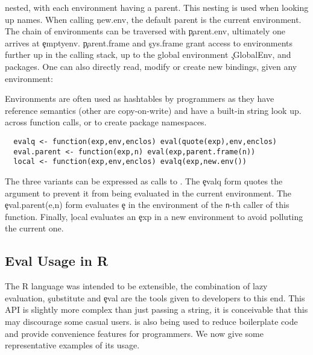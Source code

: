 \documentclass[acmsmall]{acmart}
\begin{document}
nested, with each environment having a parent. This nesting is used
when looking up names. When calling \c{new.env}, the default parent is
the current environment. The chain of environments can be traversed
with \c{parent.env}, ultimately one arrives at \c{emptyenv}.
\c{parent.frame} and \c{sys.frame} grant access to environments
further up in the calling stack, up to the global environment
\c{.GlobalEnv}, and packages. One can also directly read, modify or
create new bindings, given any environment:
\noindent Environments are often used as hashtables by programmers as
they have reference semantics (other are copy-on-write) and have a
built-in string look up. across function calls, or to create package
namespaces.
\begin{lstlisting}
  evalq <- function(exp,env,enclos) eval(quote(exp),env,enclos)
  eval.parent <- function(exp,n) eval(exp,parent.frame(n))
  local <- function(exp,env,enclos) evalq(exp,new.env())
\end{lstlisting}
The three \eval variants can be expressed as calls to \eval. The
\c{evalq} form quotes the argument to prevent it from being evaluated
in the current environment. The \c{eval.parent(e,n)} form evaluates
\c{e} in the environment of the {\tt n}-th caller of this function.
Finally, \c{local} evaluates an \c{exp} in a new environment to
avoid polluting the current one.

\subsection{Eval Usage in R}

The R language was intended to be extensible, the combination of lazy
evaluation, \c{substitute} and \c{eval} are the tools given to
developers to this end. This API is slightly more complex than just
passing a string, it is conceivable that this may discourage some
casual users. \Eval is also being used to reduce boilerplate code and
provide convenience features for programmers. We now give some
representative examples of its usage.
\end{document}
